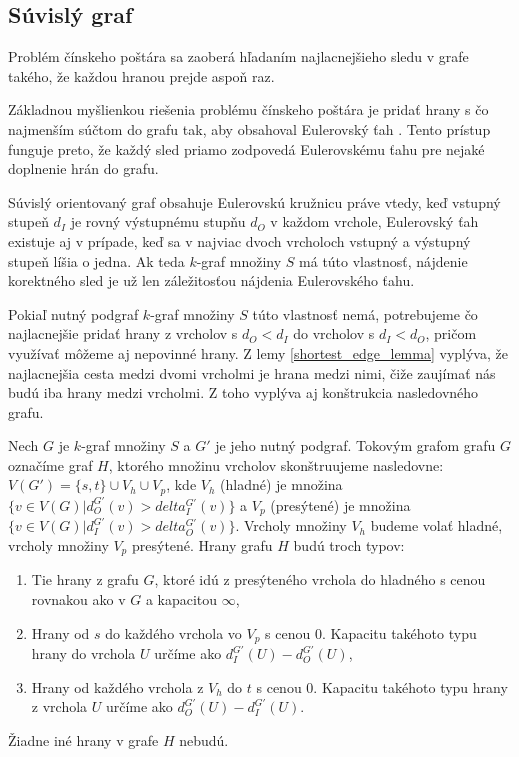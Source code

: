 \subsection{Súvislý graf}

Problém čínskeho poštára \cite{chinesepostman} sa zaoberá hľadaním najlacnejšieho sledu v grafe takého, že
každou hranou prejde aspoň raz.

Základnou myšlienkou riešenia problému čínskeho poštára je pridať hrany s čo najmenším súčtom do grafu
tak, aby obsahoval Eulerovský ťah \cite{chinesepostman}. Tento prístup funguje preto, že každý sled priamo
zodpovedá Eulerovskému ťahu pre nejaké doplnenie hrán do grafu.

Súvislý orientovaný graf obsahuje Eulerovskú kružnicu práve vtedy, keď vstupný stupeň $d_I$ je rovný
výstupnému stupňu $d_O$ v každom vrchole, Eulerovský ťah existuje aj v prípade, keď sa v najviac
dvoch vrcholoch vstupný a výstupný stupeň líšia o jedna. Ak teda $k$-graf množiny $S$ má túto
vlastnosť, nájdenie korektného sled je už len záležitosťou nájdenia Eulerovského ťahu.

Pokiaľ nutný podgraf $k$-graf množiny $S$ túto vlastnosť nemá, potrebujeme čo najlacnejšie pridať hrany z vrcholov s 
$d_O < d_I$ do vrcholov s $d_I < d_O$, pričom využívať môžeme aj nepovinné hrany.
Z lemy \ref{shortest_edge_lemma} vyplýva, že najlacnejšia cesta medzi dvomi vrcholmi je hrana medzi
nimi, čiže zaujímať nás budú iba hrany medzi vrcholmi. Z toho vyplýva aj konštrukcia nasledovného grafu.

\begin{defn}
    Nech $G$ je $k$-graf množiny $S$ a $G'$ je jeho nutný podgraf. Tokovým grafom grafu $G$
    označíme graf $H$, ktorého množinu vrcholov skonštruujeme nasledovne:
    $V(G') = \{s, t\} \cup V_h \cup V_p$, kde $V_h$ (hladné) je množina $\{ v \in V(G) | d_O^{G'}(v) > delta_I^{G'}(v) \}$
    a $V_p$ (presýtené) je množina $\{ v \in V(G) | d_I^{G'}(v) > delta_O^{G'}(v)\}$. Vrcholy množiny $V_h$
    budeme volať hladné, vrcholy množiny $V_p$ presýtené.
    Hrany grafu $H$ budú troch typov:
    \begin{enumerate}
        \item Tie hrany z grafu $G$, ktoré idú z presýteného vrchola do hladného s cenou rovnakou ako v $G$ a kapacitou $\infty$,
        \item Hrany od $s$ do každého vrchola vo $V_p$ s cenou $0$. Kapacitu takéhoto typu hrany do vrchola $U$ určíme ako $d_I^{G'}(U) - d_O^{G'}(U)$,
        \item Hrany od každého vrchola z $V_h$ do $t$ s cenou $0$. Kapacitu takéhoto typu hrany z vrchola $U$ určíme ako $d_O^{G'}(U) - d_I^{G'}(U)$.
    \end{enumerate}
    Žiadne iné hrany v grafe $H$ nebudú.
\end{defn}

